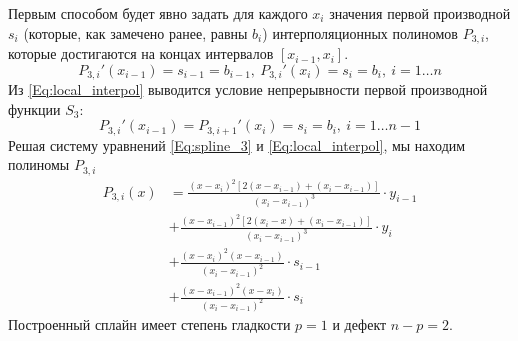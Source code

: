 Первым способом будет явно задать для каждого $x_i$ значения первой производной $s_i$ (которые, как замечено ранее, равны $b_i$) интерполяционных полиномов $P_{3,i}$, которые достигаются на концах интервалов $[x_{i-1}, x_i]$.
\begin{equation}
    P_{3,i}' (x_{i-1}) = s_{i-1} = b_{i-1},\  P_{3,i}' (x_i) = s_i = b_i,\ i = 1 \dots n			\label{Eq:local_interpol}
\end{equation}
Из \eqref{Eq:local_interpol} выводится условие непрерывности первой производной функции $S_3$:
\begin{equation*}
    P_{3,i}' (x_{i-1}) = P_{3,i+1}' (x_i) = s_i = b_i,\ i = 1\dots n-1
\end{equation*}
Решая систему уравнений \eqref{Eq:spline_3} и \eqref{Eq:local_interpol}, мы находим полиномы $P_{3,i}$
\begin{equation}
\begin{split}
    P_{3,i} (x) & =
    \frac{(x-x_i)^2 [2 (x-x_{i-1}) + (x_i-x_{i-1})]} {(x_i-x_{i-1})^3}
    \cdot y_{i-1} \\
    & + \frac{(x-x_{i-1} )^2 [2(x_i-x)+(x_i-x_{i-1} )]} {(x_i-x_{i-1} )^3}
    \cdot y_i \\
	& + \frac {(x-x_i )^2 (x-x_{i-1} )}{(x_i-x_{i-1} )^2} 
	\cdot  s_{i-1} \\
	& +	\frac{(x-x_{i-1} )^2 (x-x_i )} {(x_i-x_{i-1} )^2}
	\cdot s_i
\end{split}
\end{equation}
	Построенный сплайн имеет степень гладкости $p=1$ и дефект $n-p=2$.